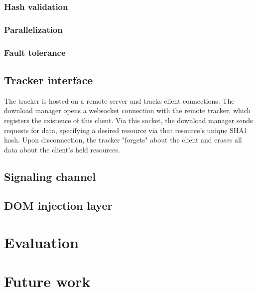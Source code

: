 \documentclass[letterpaper,twocolumn,10pt]{article}
\begin{document}
\subsubsection{Hash validation}


\subsubsection{Parallelization}


\subsubsection{Fault tolerance}


\subsection{Tracker interface}

The tracker is hosted on a remote server and tracks client connections. The download manager opens a websocket connection with the remote tracker, which registers the existence of this client. Via this socket, the download manager sends requests for data, specifying a desired resource via that resource's unique SHA1 hash. Upon disconnection, the tracker "forgets" about the client and erases all data about the client's held resources.

\subsection{Signaling channel}


\subsection{DOM injection layer}


\section{Evaluation}


\section{Future work}
\end{document}
